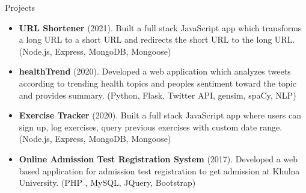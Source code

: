 \documentclass[]{mcdowellcv}
\begin{document}
	
	\begin{cvsection}{Projects}
		\begin{cvsubsection}{}{}{}
			\begin{itemize}
			 
			 \item \textbf{URL Shortener} (2021). Built a full stack JavaScript app which transforms a long URL to a short URL and redirects the short URL to the long URL. (Node.js, Express, MongoDB, Mongoose)
			 
			 \item \textbf{healthTrend} (2020). Developed a web application which analyzes tweets according to trending health topics and peoples sentiment toward the topic and provides summary. (Python, Flask, Twitter API, gensim, spaCy, NLP)
			 
			 \item \textbf{Exercise Tracker} (2020). Built a full stack JavaScript app where users can sign up, log exercises, query previous exercises with custom date range. (Node.js, Express, MongoDB, Mongoose) 
			 
			
    		  \item \textbf{Online Admission Test Registration System} (2017). 
    			Developed a web based application for admission test registration to get admission at Khulna University. (PHP , MySQL, JQuery, Bootstrap)
				
				
				
				
			\end{itemize}
		\end{cvsubsection}
	\end{cvsection}
	
\end{document}
